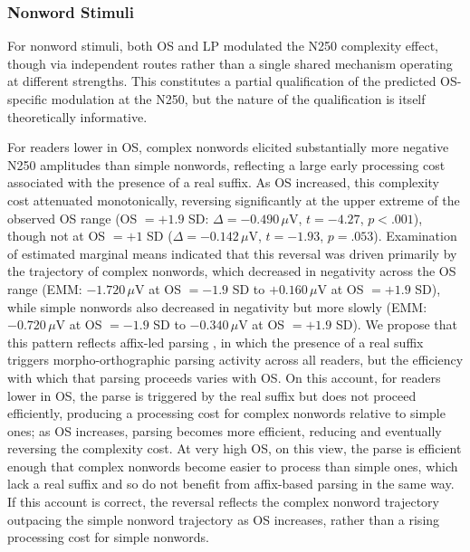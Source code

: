 \documentclass[utf8]{FrontiersinHarvard} %
\begin{document}
	
	\subsubsection{Nonword Stimuli}
	
	For nonword stimuli, both OS and LP modulated the N250 complexity effect, though via independent routes rather than a single shared mechanism operating at different strengths. This constitutes a partial qualification of the predicted OS-specific modulation at the N250, but the nature of the qualification is itself theoretically informative.
	
	For readers lower in OS, complex nonwords elicited substantially more negative N250 amplitudes than simple nonwords, reflecting a large early processing cost associated with the presence of a real suffix. As OS increased, this complexity cost attenuated monotonically, reversing significantly at the upper extreme of the observed OS range (OS $= +1.9$ SD: $\Delta = -0.490\,\mu$V, $t = -4.27$, $p < .001$), though not at OS $= +1$ SD ($\Delta = -0.142\,\mu$V, $t = -1.93$, $p = .053$). Examination of estimated marginal means indicated that this reversal was driven primarily by the trajectory of complex nonwords, which decreased in negativity across the OS range (EMM: $-1.720\,\mu$V at OS $= -1.9$ SD to $+0.160\,\mu$V at OS $= +1.9$ SD), while simple nonwords also decreased in negativity but more slowly (EMM: $-0.720\,\mu$V at OS $= -1.9$ SD to $-0.340\,\mu$V at OS $= +1.9$ SD). We propose that this pattern reflects affix-led parsing \citep{taft_lexical_1975, rastleMorphologicalDecompositionBased2008}, in which the presence of a real suffix triggers morpho-orthographic parsing activity across all readers, but the efficiency with which that parsing proceeds varies with OS. On this account, for readers lower in OS, the parse is triggered by the real suffix but does not proceed efficiently, producing a processing cost for complex nonwords relative to simple ones; as OS increases, parsing becomes more efficient, reducing and eventually reversing the complexity cost. At very high OS, on this view, the parse is efficient enough that complex nonwords become easier to process than simple ones, which lack a real suffix and so do not benefit from affix-based parsing in the same way. If this account is correct, the reversal reflects the complex nonword trajectory outpacing the simple nonword trajectory as OS increases, rather than a rising processing cost for simple nonwords.
	
\end{document}
